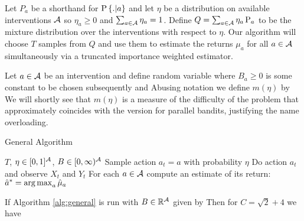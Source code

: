 Let $P_a$ be a shorthand for $\P{.|a}$ and let $\eta$ be a distribution on available interventions $\calA$ so $\eta_a \geq 0$ and $\sum_{a \in \calA} \eta_a = 1$.
Define $Q = \sum_{a \in \calA} \eta_a \Ps_a$ to be the mixture distribution over the interventions with respect to $\eta$.
Our algorithm will choose $T$ samples from $Q$ and use them to estimate the returns $\mu_a$ for all $a \in \calA$ simultaneously via
a truncated importance weighted estimator.

Let $a \in \calA$ be an intervention and define random variable
where $B_a \geq 0$ is some constant to be chosen subsequently and
Abusing notation we define $m(\eta)$ by
We will shortly see that $m(\eta)$ is a measure of the difficulty of the problem that approximately coincides with the version for parallel bandits, justifying the name overloading.

\begin{algorithm}[H]
\caption{General Algorithm}\label{alg:general}
\begin{algorithmic}
 $T$, $\eta \in [0,1]^{\calA}$, $B \in [0,\infty)^{\calA}$
\STATE Sample action $a_t = a$ with probability $\eta$
\STATE Do action $a_t$ and observe $X_t$ and $Y_t$
\ENDFOR
\STATE For each $a \in \calA$ compute an estimate of its return:
 $\hat a^* = \argmax_a \hat \mu_a$
\end{algorithmic}
\end{algorithm}

\begin{theorem}\label{thm:general}
If Algorithm \ref{alg:general} is run with $B \in \R^{\calA}$ given by
Then for $C = \sqrt{2} + 4$ we have
\end{theorem}

